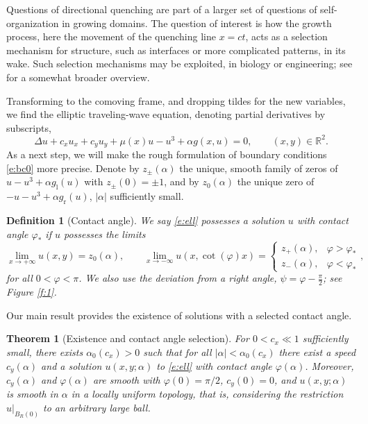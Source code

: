 \documentclass[10pt]{article}
\newtheorem{Theorem}[Lemma]{Theorem}
\newtheorem{Definition}[Lemma]{Definition}
\newcommand{\R}{\mathbb{R}}
\begin{document}
Questions of directional quenching are part of a larger set of questions of self-organization in growing domains. The question of interest is how the growth process, here the movement of the quenching line $x=ct$, acts as a selection mechanism for structure, such as interfaces or more complicated patterns, in its wake. Such selection mechanisms may be exploited, in biology or engineering; see \cite{Monteiro_Scheel} for a somewhat broader overview. 

Transforming to the comoving frame, and dropping tildes for the new variables, we find the elliptic traveling-wave equation, denoting partial derivatives by subscripts, 
\begin{equation}\label{e:ell}
\Delta u +c_x u_x + c_y u_y +  \mu(x) u  - u^3 + \alpha g(x,u)=0 ,\qquad (x,y)\in\R^2.
\end{equation}
As a next step, we will make the rough formulation of boundary conditions \eqref{e:bc0} more precise. Denote by $z_\pm(\alpha)$ the unique, smooth family of zeros of $u-u^3+\alpha g_\mathrm{l}(u)$ with $z_\pm(0)=\pm1$, and by $z_0(\alpha)$ the unique zero of $-u-u^3+\alpha g_\mathrm{r}(u)$, $|\alpha|$ sufficiently small. 


\begin{Definition}[Contact angle]\label{d:contact}
We say \eqref{e:ell} possesses a solution $u$ with contact angle $\varphi_*$ if $u$ possesses the limits 
\begin{equation}\label{e:bc}
\lim_{x\to +\infty} u(x,y)=z_0(\alpha), \qquad \lim_{x\to -\infty} u(x,\cot(\varphi)x)=\left\{\begin{array}{ll}
z_+(\alpha),& \varphi>\varphi_*\\
z_-(\alpha),& \varphi<\varphi_*
\end{array}\right. ,
\end{equation}
for all $0<\varphi<\pi$. We also use the deviation from a right angle, $\psi=\varphi-\frac{\pi}{2}$; see Figure \ref{f:1}.
\end{Definition}
Our main result provides the existence of solutions with a selected contact angle. 
\begin{Theorem}[Existence and contact angle selection]\label{t:1}
For $0<c_x\ll1$ sufficiently small, there exists $\alpha_0(c_x)>0$ such that for all $|\alpha|<\alpha_0(c_x)$ there exist a speed $c_y(\alpha)$ and a solution  $u(x,y;\alpha)$ to \eqref{e:ell} with contact angle $\varphi(\alpha)$. Moreover, $c_y(\alpha)$ and $\varphi(\alpha)$ are smooth with $\varphi(0)=\pi/2$, $c_y(0)=0$, and $u(x,y;\alpha)$ is smooth in $\alpha$  in a locally uniform topology, that is, considering the restriction $u|_{B_R(0)}$ to an arbitrary large ball.
\end{Theorem}
\end{document}
